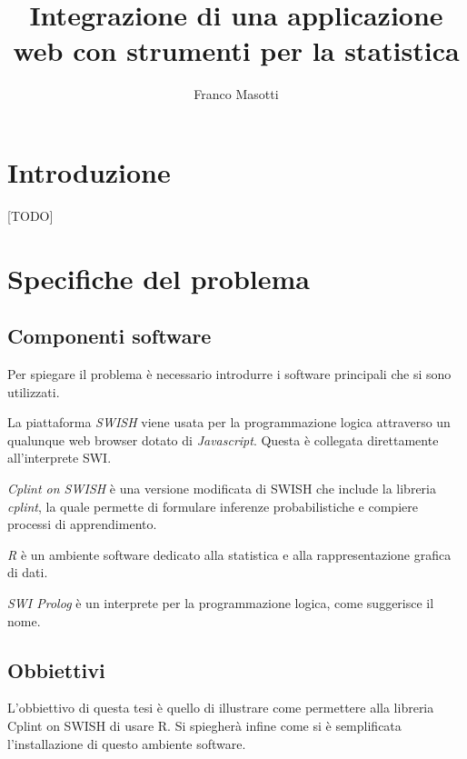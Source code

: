 \documentclass[10pt,titlepage,twoside,a4paper]{report}
\title{Integrazione di una applicazione web con strumenti per la statistica}
\author{Franco Masotti}
\begin{document}

\maketitle
\newpage
\tableofcontents
\newpage
\listoffigures
\newpage
\listoflistings
\cleardoublepage





\chapter{Introduzione} \label{introduzione}

[TODO]

\chapter{Specifiche del problema} \label{ch:specifiche-del-problema}
    \section{Componenti software}
Per spiegare il problema è necessario introdurre i software principali che si 
sono utilizzati.

La piattaforma \emph{SWISH}\cite{swish} viene usata per la programmazione 
logica attraverso un qualunque web browser dotato di \emph{Javascript}. Questa 
è collegata direttamente all'interprete SWI.

\emph{Cplint on SWISH} è una versione modificata di SWISH che include la 
libreria \emph{cplint}, la quale permette di formulare inferenze 
probabilistiche e compiere processi di apprendimento\cite{cplint}.

\emph{R} è un ambiente software dedicato alla statistica e 
alla rappresentazione grafica di dati\cite{r}.

\emph{SWI Prolog} è un interprete per la programmazione 
logica\cite{swiprolog}, come suggerisce il nome\cite{prolog}.

    \section{Obbiettivi}
L'obbiettivo di questa tesi è quello di illustrare come 
permettere alla libreria Cplint on SWISH di usare R.
Si spiegherà infine come si è semplificata l'installazione di questo ambiente 
software.
\end{document}
